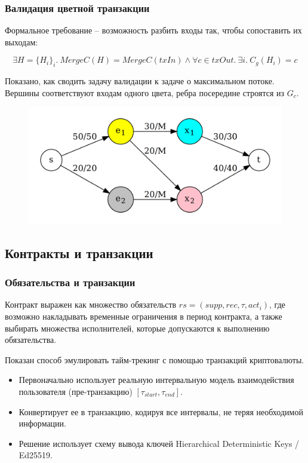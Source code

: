 \documentclass[11pt,handout,pdf,hyperref={unicode}]{beamer}
\begin{document}
\begin{frame}
  \frametitle{Валидация цветной транзакции}

  Формальное требование -- возможность разбить входы так, чтобы
  сопоставить их выходам:

  \[
  \exists H = \{H_i\}_i. \ MergeC(H) = MergeC(txIn) \wedge \forall c \in txOut . \ \exists i . \ C_g(H_i) = c
  \]


  Показано, как сводить задачу валидации к задаче о максимальном
  потоке. Вершины соответствуют входам одного цвета, ребра посередине
  строятся из $G_c$.

  \begin{figure}[t]
  \includegraphics[scale=0.12]{pres_colortx_graph}
  \centering
  \end{figure}
\end{frame}

\subsection{Контракты и транзакции}

\begin{frame}
  \frametitle{Обязательства и транзакции} Контракт выражен как
  множество обязательств $rs = (supp, rec, \tau, act_i)$, где возможно
  накладывать временные ограничения в период контракта, а также
  выбирать множества исполнителей, которые допускаются к выполнению
  обязательства.

  Показан способ эмулировать тайм-трекинг с помощью транзакций криптовалюты.
  \begin{itemize}
  \item Первоначально использует реальную интервальную модель
    взаимодействия пользователя (пре-транзакцию) $[\tau_{start}, \tau_{end}]$.
  \item Конвертирует ее в транзакцию, кодируя все интервалы, не теряя
    необходимой информации.
  \item Решение использует схему вывода ключей Hierarchical
    Deterministic Keys / Ed25519.
  \end{itemize}
\end{frame}
\end{document}
